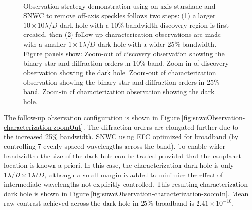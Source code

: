 \documentclass[]{spie}  %
\begin{document}
\begin{figure}[t!]
\centering
{}
\\
\centering
{}
\caption[Companion Leakage]
{\label{fig:snwcObservation} Observation strategy demonstration using on-axis starshade and SNWC to remove off-axis speckles follows two steps:  (1)  a larger $10\times10 \lambda/D$ dark hole with a 10\% bandwidth discovery region is first created, then (2) follow-up characterization observations are made with a smaller $1\times1 \lambda/D$ dark hole with a wider 25\% bandwidth. Figure panels show:  Zoom-out of discovery observation showing the binary star and diffraction orders in 10\% band.  Zoom-in of discovery observation showing the dark hole.  Zoom-out of characterization observation showing the binary star and diffraction orders in 25\% band.  Zoom-in of characterization observation showing the dark hole.}
\end{figure}

The follow-up observation configuration is shown in Figure \ref{fig:snwcObservation-characterization-zoomOut}. The diffraction orders are elongated further due to the increased 25\% bandwidth. SNWC using EFC optimized for broadband (by controlling 7 evenly spaced wavelengths across the band). To enable wider bandwidths the size of the dark hole can be traded provided that the exoplanet location is known a priori. In this case, the characterization dark hole is only $1 \lambda/D \times 1 \lambda/D$, although a small margin is added to minimize the effect of intermediate wavelengths not explicitly controlled. This resulting characterization dark hole is shown in Figure \ref{fig:snwcObservation-characterization-zoomIn}. Mean raw contrast achieved across the dark hole in 25\% broadband is $2.41 \times 10^{-10}$. 
\end{document}

